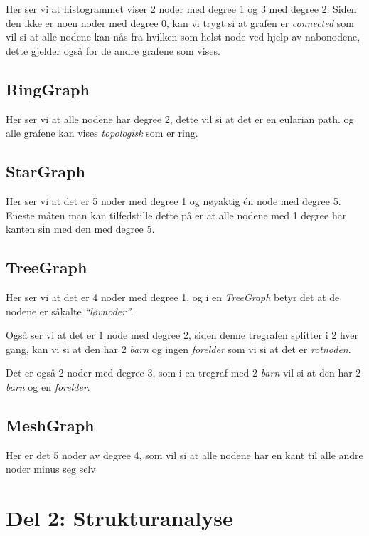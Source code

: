 \documentclass[11pt]{article}
\begin{document}
Her ser vi at histogrammet viser 2 noder med degree 1 og 3 med degree 2.
Siden den ikke er noen noder med degree 0, kan vi trygt si at grafen er
\emph{connected} som vil si at alle nodene kan nås fra hvilken som helst
node ved hjelp av nabonodene, dette gjelder også for de andre grafene
som vises.

\hypertarget{ringgraph}{%
\subsection*{RingGraph}\label{ringgraph}}

Her ser vi at alle nodene har degree 2, dette vil si at det er en
eularian path. og alle grafene kan vises \emph{topologisk} som er ring.

\hypertarget{stargraph}{%
\subsection*{StarGraph}\label{stargraph}}

Her ser vi at det er 5 noder med degree 1 og nøyaktig én node med degree
5. Eneste måten man kan tilfedstille dette på er at alle nodene med 1
degree har kanten sin med den med degree 5.

\hypertarget{treegraph}{%
\subsection*{TreeGraph}\label{treegraph}}

Her ser vi at det er 4 noder med degree 1, og i en \emph{TreeGraph}
betyr det at de nodene er såkalte \emph{``løvnoder''}.

Også ser vi at det er 1 node med degree 2, siden denne tregrafen
splitter i 2 hver gang, kan vi si at den har 2 \emph{barn} og ingen
\emph{forelder} som vi si at det er \emph{rotnoden}.

Det er også 2 noder med degree 3, som i en tregraf med 2 \emph{barn} vil
si at den har 2 \emph{barn} og en \emph{forelder}.

\hypertarget{meshgraph}{%
\subsection*{MeshGraph}\label{meshgraph}}

Her er det 5 noder av degree 4, som vil si at alle nodene har en kant
til alle andre noder minus seg selv

    \hypertarget{del-2-strukturanalyse}{%
\section*{Del 2: Strukturanalyse}\label{del-2-strukturanalyse}}
\end{document}
